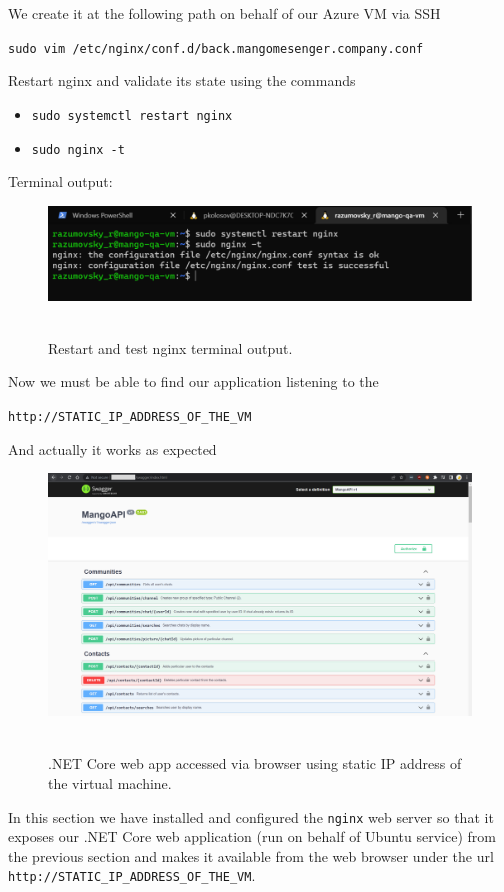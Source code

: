 We create it at the following path on behalf of our Azure VM via SSH
\begin{center}
    \texttt{sudo vim /etc/nginx/conf.d/back.mangomesenger.company.conf}
\end{center}
Restart nginx and validate its state using the commands
\begin{itemize}
    \item \texttt{sudo systemctl restart nginx}
    \item \texttt{sudo nginx -t}
\end{itemize}
Terminal output:
\begin{figure}[H]
    \centering
    \includegraphics[width=1\textwidth]{img/06_test_nginx}
    ~\caption{Restart and test nginx terminal output.}\label{fig:figure16}
\end{figure}
Now we must be able to find our application listening to the
\begin{center}
    \texttt{http://STATIC\_IP\_ADDRESS\_OF\_THE\_VM}
\end{center}
And actually it works as expected
\begin{figure}[H]
    \centering
    \includegraphics[width=1\textwidth]{img/06_view_in_browser}
    ~\caption{.NET Core web app accessed via browser using static IP address of the virtual machine.}\label{fig:figure17}
\end{figure}
In this section we have installed and configured the \texttt{nginx} web server so that it exposes our .NET Core web
application (run on behalf of Ubuntu service) from the previous section and makes it available
from the web browser under the url \texttt{http://STATIC\_IP\_ADDRESS\_OF\_THE\_VM}.
